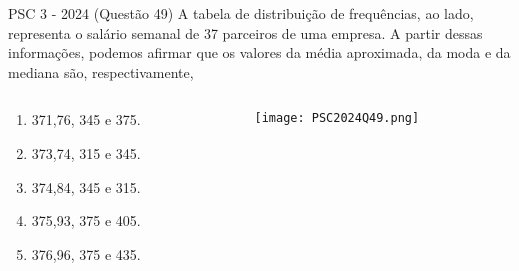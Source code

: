 \documentclass[aspectratio=169]{beamer}
\newif\ifusarcorvermelha
\newcommand{\vermelho}[1]{%
    \ifusarcorvermelha
        {\color{red}#1}%
    \else
        #1%
    \fi
}
\begin{document}
    \begin{frame}{PSC 3 - 2024 (Questão 49)}
        A tabela de distribuição de frequências, ao lado, representa o salário semanal de 37 parceiros de uma empresa. A partir dessas informações, podemos afirmar que os valores da média aproximada, da moda e da mediana são, respectivamente,

        \begin{columns}
            \begin{column}{0.3\textwidth}
                \begin{enumerate}[a]
                    \item \vermelho{371,76, 345 e 375.} %
                    \item 373,74, 315 e 345.
                    \item 374,84, 345 e 315.
                    \item 375,93, 375 e 405.
                    \item 376,96, 375 e 435.
                \end{enumerate}
            \end{column}

            \begin{column}{0.6\textwidth}
                \texttt{[image: PSC2024Q49.png]}
            \end{column}
        \end{columns}
                
    \end{frame}
   
\end{document}
